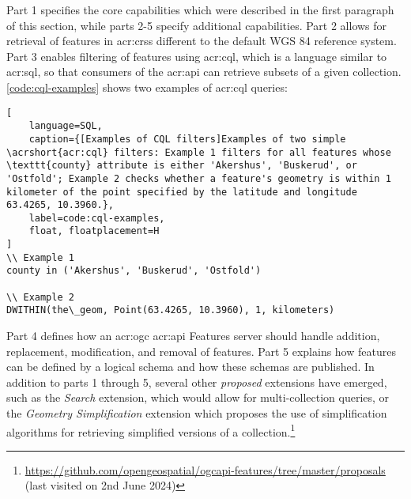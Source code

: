 Part 1 specifies the core capabilities which were described in the first paragraph of this section, while parts 2-5 specify additional capabilities. Part 2 allows for retrieval of features in \glspl{acr:crs} different to the default WGS 84 reference system. Part 3 enables filtering of features using \gls{acr:cql}, which is a language similar to \acrshort{acr:sql}, so that consumers of the \acrshort{acr:api} can retrieve subsets of a given collection. \autoref{code:cql-examples} shows two examples of \gls{acr:cql} queries:

\begin{lstlisting}[
    language=SQL,
    caption={[Examples of CQL filters]Examples of two simple \acrshort{acr:cql} filters: Example 1 filters for all features whose \texttt{county} attribute is either 'Akershus', 'Buskerud', or 'Ostfold'; Example 2 checks whether a feature's geometry is within 1 kilometer of the point specified by the latitude and longitude 63.4265, 10.3960.},
    label=code:cql-examples,
    float, floatplacement=H
]
\\ Example 1
county in ('Akershus', 'Buskerud', 'Ostfold')

\\ Example 2
DWITHIN(the\_geom, Point(63.4265, 10.3960), 1, kilometers)
\end{lstlisting}

Part 4 defines how an \acrshort{acr:ogc} \acrshort{acr:api} Features server should handle addition, replacement, modification, and removal of features. Part 5 explains how features can be defined by a logical schema and how these schemas are published. In addition to parts 1 through 5, several other \textit{proposed} extensions have emerged, such as the \textit{Search} extension, which would allow for multi-collection queries, or the \textit{Geometry Simplification} extension which proposes the use of simplification algorithms for retrieving simplified versions of a collection.\footnote{\url{https://github.com/opengeospatial/ogcapi-features/tree/master/proposals} (last visited on 2nd June 2024)}





